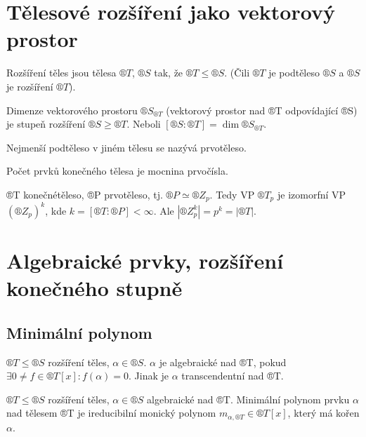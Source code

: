 \documentclass[12pt]{article}                   %
\begin{document}
\section{Tělesové rozšíření jako vektorový prostor}
    \begin{definice}
        Rozšíření těles jsou tělesa $®T$, $®S$ tak, že $®T ≤ ®S$. (Čili $®T$ je podtěleso $®S$ a $®S$ je rozšíření $®T$).
    \end{definice}

    \begin{definice}
        Dimenze vektorového prostoru $®S_{®T}$ (vektorový prostor nad ®T odpovídající ®S) je stupeň rozšíření $®S≥®T$. Neboli $[®S:®T] = \dim ®S_{®T}$.
    \end{definice}


    \begin{definice}[Prvotěleso]
        Nejmenší podtěleso v jiném tělesu se nazývá prvotěleso.
    \end{definice}

    \begin{tvrzeni}
        Počet prvků konečného tělesa je mocnina prvočísla.

        \begin{dukazin}
            ®T konečnétěleso, ®P prvotěleso, tj. $®P \simeq ®Z_p$. Tedy VP $®T_p$ je izomorfní VP $(®Z_p)^k$, kde $k = [®T:®P] < ∞$. Ale $|®Z_p^k| = p^k = |®T|$.
        \end{dukazin}
    \end{tvrzeni}

\section{Algebraické prvky, rozšíření konečného stupně}
    \subsection{Minimální polynom}
        \begin{definice}
            $®T ≤ ®S$ rozšíření těles, $\alpha \in ®S$. $\alpha$ je algebraické nad ®T, pokud $\exists 0 ≠ f \in ®T[x]: f(\alpha) = 0$. Jinak je $\alpha$ transcendentní nad ®T.
        \end{definice}

        \begin{definice}
            $®T ≤ ®S$ rozšíření těles, $\alpha \in ®S$ algebraické nad ®T. Minimální polynom prvku $\alpha$ nad tělesem ®T je ireducibilní monický polynom $m_{\alpha, ®T} \in ®T[x]$, který má kořen $\alpha$.
        \end{definice}
\end{document}
